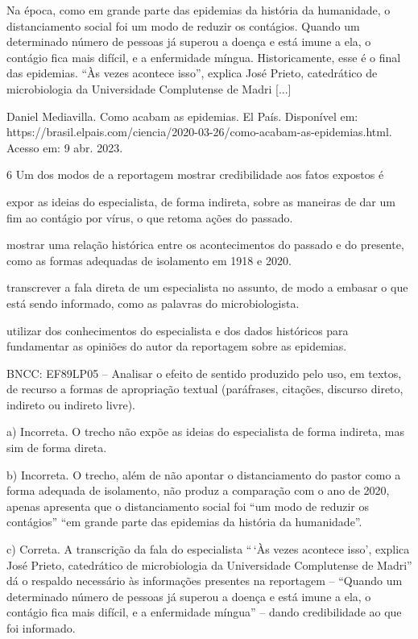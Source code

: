\begin{escolha}
\begin{escolha}
\begin{escolha}
\begin{escolha}
\begin{escolha}
Na época, como em grande parte das epidemias da história da humanidade,
o distanciamento social foi um modo de reduzir os contágios. Quando um
determinado número de pessoas já superou a doença e está imune a ela, o
contágio fica mais difícil, e a enfermidade míngua. Historicamente, esse
é o final das epidemias. ``Às vezes acontece isso'', explica José
Prieto, catedrático de microbiologia da Universidade Complutense de
Madri {[}...{]}

Daniel Mediavilla. Como acabam as epidemias. El País. Disponível em:
https://brasil.elpais.com/ciencia/2020-03-26/como-acabam-as-epidemias.html.
Acesso em: 9 abr. 2023.

\num{6} Um dos modos de a reportagem mostrar credibilidade aos fatos
expostos é

\begin{escolha}
\item expor as ideias do especialista, de forma indireta, sobre as
maneiras de dar um fim ao contágio por vírus, o que retoma ações do
passado.

\item mostrar uma relação histórica entre os acontecimentos do passado e
do presente, como as formas adequadas de isolamento em 1918 e 2020.

\item transcrever a fala direta de um especialista no assunto, de modo a
embasar o que está sendo informado, como as palavras do microbiologista.

\item utilizar dos conhecimentos do especialista e dos dados históricos
para fundamentar as opiniões do autor da reportagem sobre as epidemias.
\end{escolha}

BNCC: EF89LP05 -- Analisar o efeito de sentido produzido pelo uso, em
textos, de recurso a formas de apropriação textual (paráfrases,
citações, discurso direto, indireto ou indireto livre).

a) Incorreta. O trecho não expõe as ideias do especialista de forma
indireta, mas sim de forma direta.

b) Incorreta. O trecho, além de não apontar o distanciamento do pastor
como a forma adequada de isolamento, não produz a comparação com o ano
de 2020, apenas apresenta que o distanciamento social foi ``um modo de
reduzir os contágios'' ``em grande parte das epidemias da história da
humanidade''.

c) Correta. A transcrição da fala do especialista ``\,`Às vezes acontece
isso', explica José Prieto, catedrático de microbiologia da Universidade
Complutense de Madri'' dá o respaldo necessário às informações presentes
na reportagem -- ``Quando um determinado número de pessoas já superou a
doença e está imune a ela, o contágio fica mais difícil, e a enfermidade
míngua'' -- dando credibilidade ao que foi informado.


\end{escolha}
\end{escolha}
\end{escolha}
\end{escolha}
\end{escolha}
